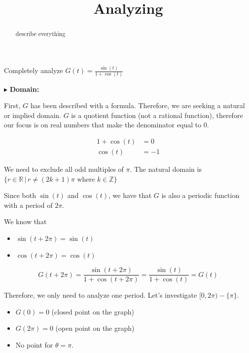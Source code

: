 \documentclass{ximera}
\title{Analyzing}
\begin{document}
\begin{abstract}
describe everything
\end{abstract}
\maketitle







Completely analyze $G(t) = \frac{\sin(t)}{1 + \cos(t)}$

$\blacktriangleright$  \textbf{\textcolor{blue!55!black}{Domain: }} 

First, $G$ has been described with a formula.  Therefore, we are seeking a natural or implied domain. $G$ is a quotient function (not a rational function), therefore our focus is on real numbers that make the denominator equal to $0$.



\begin{align*}
1  + \cos(t) & = 0 \\
\cos(t) & = -1
\end{align*}


We need to exclude all odd multiples of $\pi$.  The natural domain is $\{  r \in \mathbb{R} \, | \, r \ne (2k+1)\pi \text{ where } k \in \mathbb{Z}   \}$



\begin{observation}  

Since both $\sin(t)$ and $\cos(t)$, we have that $G$ is also a periodic function with a period of $2\pi$. 

We know that
\begin{itemize}
  \item $\sin(t + 2\pi) = \sin(t)$
  \item $\cos(t + 2\pi) = \cos(t)$
\end{itemize}

\[    G(t + 2\pi) = \frac{\sin(t+2\pi)}{1 + \cos(t+2\pi)} = \frac{\sin(t)}{1 + \cos(t)} = G(t)   \]



\end{observation}


Therefore, we only need to analyze one period.  Let's investigate $[0, 2\pi) - \{ \pi \}$.

\begin{itemize}
\item $G(0) = 0$   (closed point on the graph)
\item $G(2\pi) = 0$  (open point on the graph)
\item No point for $\theta = \pi$.
\end{itemize}
\end{document}
